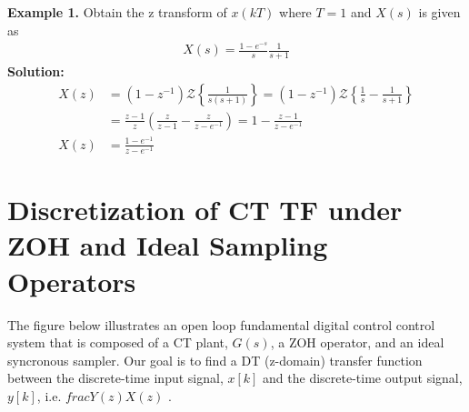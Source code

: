 \documentclass[twoside]{article}
\begin{document}
\textbf{Example 1.} Obtain the z transform of $x(kT)$ where $T=1$ and $X(s)$ is
given as
%
\begin{align*}
  X(s) = \frac{1 - e^{-s}}{s} \frac{1}{s+1}
\end{align*}
%
\textbf{Solution:}
%
\begin{align*}
  X(z) &= \left( 1 - z^{-1} \right) \mathcal{Z} \left\lbrace \frac{1}{s(s+1)}
  \right\rbrace
= \left( 1 - z^{-1} \right) \mathcal{Z} \left\lbrace \frac{1}{s} -
  \frac{1}{s+1} \right\rbrace
\\
&= \frac{z-1}{z} \left( \frac{z}{z-1} - \frac{z}{z-e^{-1}}  \right)
= 1 - \frac{z-1}{z-e^{-1}} \\
X(z) &= \frac{1-e^{-1}}{z-e^{-1}}
\end{align*}

\section{Discretization of CT TF under ZOH and Ideal Sampling Operators}

The figure below illustrates an open loop fundamental digital control control system 
that is composed of a CT plant, $G(s)$, a ZOH operator, and an ideal syncronous sampler. 
Our goal is to find a DT (z-domain) transfer function between the discrete-time input signal, 
$x[k]$ and the discrete-time output signal, $y[k]$, i.e. $ frac{Y(z)}{X(z)}$ .
\end{document}
